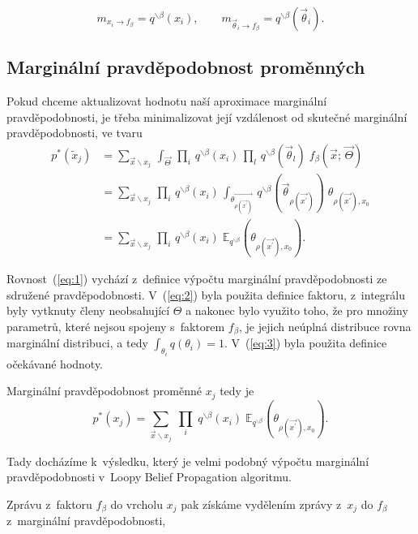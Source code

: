 $$m_{x_i \rightarrow f_\beta} = q^{\backslash \beta}(x_i), 
\quad \quad
m_{\vec\theta_i \rightarrow f_\beta} = q^{\backslash \beta}(\vec\theta_i).$$

\subsection{Marginální pravděpodobnost proměnných}

Pokud chceme aktualizovat hodnotu naší aproximace marginální pravděpodobnosti,
je třeba minimalizovat její vzdálenost od skutečné marginální
pravděpodobnosti, ve tvaru
\begin{align}
p^*(\tilde{x}_j) &=
\sum_{\vec{x} \backslash x_j} \,
	\int_{\vec{\Theta}} \,
    		\prod_i \,
			q^{\backslash \beta}(x_i) \,
		\prod_l \,
			q^{\backslash \beta}(\vec{\theta}_l) \;
		f_\beta(\vec{x};\,
    		  \vec{\Theta})
\label{eq:1} 
\\
&=
\sum_{\vec{x} \backslash x_j} \,
	\prod_i \,
		q^{\backslash \beta}(x_i) \,
    \int_{\vec{\theta_{\rho(\vec{x^\prime})}}} \,
	    q^{\backslash \beta}(\vec{\theta}_{\rho(\vec{x^\prime})})\;
    \theta_{\rho(\vec{x^\prime}), x_0} \label{eq:2} 
\\
&= 
\sum_{\vec{x} \backslash x_j} \,
	\prod_i \,
		q^{\backslash \beta}(x_i)\;
    		\mathbb{E}_{q^{\backslash \beta}} 
			(\theta_{\rho(\vec{x^\prime}), x_0}).
\label{eq:3}
\end{align}

Rovnost~(\ref{eq:1}) vychází z~definice výpočtu marginální pravděpodobnosti ze
sdružené pravděpodobnosti.
V~(\ref{eq:2}) byla použita definice faktoru, z~integrálu byly vytknuty členy neobsahující $\Theta$ a nakonec bylo využito toho, že pro
množiny parametrů, které nejsou spojeny s~faktorem $f_\beta$, je jejich neúplná
distribuce rovna marginální distribuci, a tedy $\int_{\theta_i} q(\theta_i) =
1$. V~(\ref{eq:3}) byla použita definice očekávané hodnoty.

Marginální pravděpodobnost proměnné $x_j$ tedy je
\begin{equation}
p^*(x_j) =
\sum_{\vec{x} \backslash x_j} \;
	\prod_i \;
		q^{\backslash \beta}(x_i)\;
    		\mathbb{E}_{q^{\backslash \beta}} 
			(\theta_{\rho(\vec{x^\prime}), x_0}).
\end{equation}

Tady docházíme k~výsledku, který je velmi podobný výpočtu marginální
pravděpodobnosti v~Loopy Belief Propagation algoritmu.

Zprávu z~faktoru $f_\beta$ do vrcholu $x_j$ pak získáme vydělením zprávy z~$x_j$ do $f_\beta$ z~marginální pravděpodobnosti,

